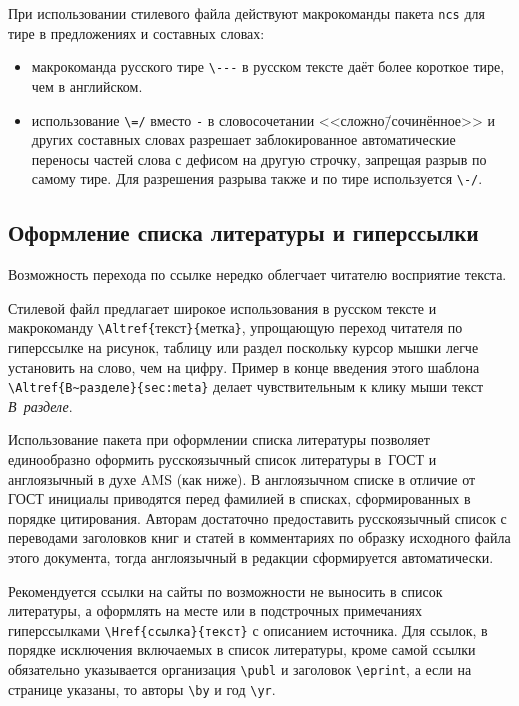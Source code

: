 \documentclass{psta}%
\begin{document}
При использовании стилевого файла действуют макрокоманды пакета \texttt{ncs} для тире в предложениях и составных словах:
\begin{itemize}
\item макрокоманда русского тире \verb|\---| в русском тексте даёт более короткое тире, чем в английском.
\item использование \verb|\=/| вместо \verb|-| в словосочетании
 <<сложно\=/сочинённое>> и других составных словах разрешает заблокированное автоматические переносы частей слова с дефисом на другую строчку, запрещая разрыв по самому тире.
Для разрешения разрыва также и по тире используется \verb|\-/|.
\end{itemize}


\subsection{Оформление списка литературы и гиперссылки}
Возможность перехода по ссылке нередко облегчает читателю восприятие текста.

Стилевой файл предлагает широкое использования в русском тексте и макрокоманду \verb|\Altref{|текст\verb|}{|метка\verb|}|, упрощающую переход читателя по гиперссылке на рисунок, таблицу или раздел поскольку курсор мышки легче установить на слово, чем на цифру.
Пример в конце введения этого шаблона \verb|\Altref{В~разделе}{sec:meta}| делает чувствительным к клику мыши текст \emph{В~разделе}.

Использование пакета  при оформлении списка литературы позволяет единообразно оформить русскоязычный список литературы в~ГОСТ и англоязычный в духе AMS (как ниже).
В англоязычном списке в отличие от ГОСТ инициалы приводятся перед фамилией в списках, сформированных в порядке цитирования.
Авторам достаточно предоставить русскоязычный список с переводами заголовков книг и статей в комментариях по образку исходного файла этого документа, тогда англоязычный в редакции сформируется автоматически.

Рекомендуется ссылки на сайты по возможности не выносить в список литературы, а оформлять на месте или в подстрочных примечаниях гиперссылками \verb|\Href{ссылка}{текст}| с описанием источника. Для ссылок, в порядке исключения включаемых в список литературы, кроме самой ссылки обязательно указывается организация \verb|\publ| и заголовок  \verb|\eprint|, а если на странице указаны, то авторы \verb|\by| и год \verb|\yr|.
\end{document}
